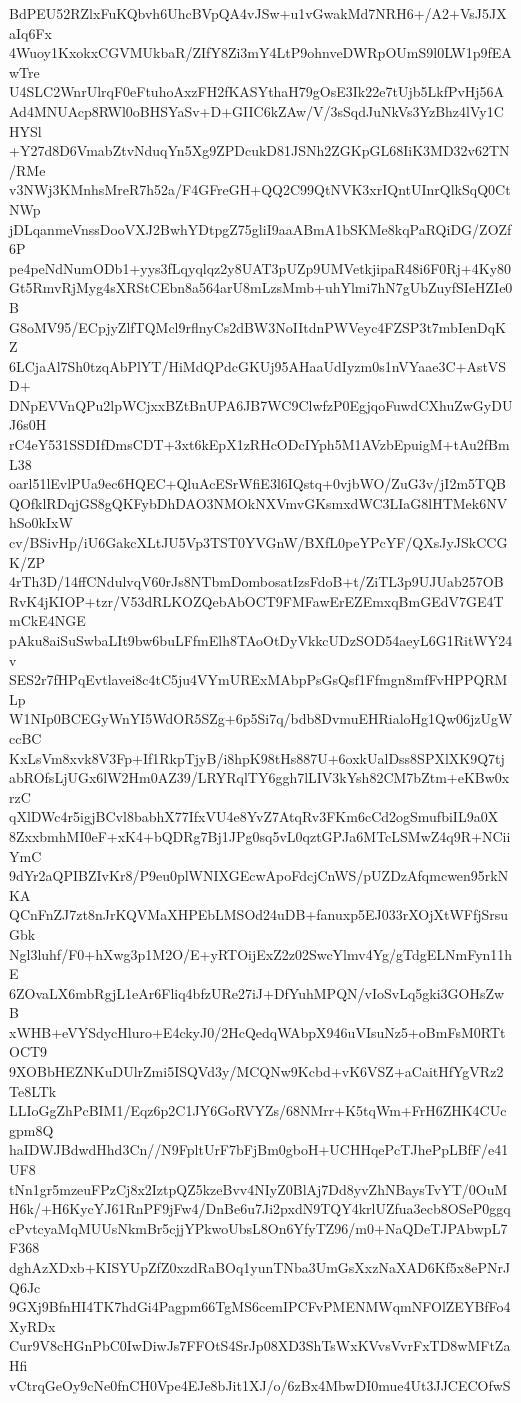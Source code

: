 BdPEU52RZlxFuKQbvh6UhcBVpQA4vJSw+u1vGwakMd7NRH6+/A2+VsJ5JXaIq6Fx
4Wuoy1KxokxCGVMUkbaR/ZIfY8Zi3mY4LtP9ohnveDWRpOUmS9l0LW1p9fEAwTre
U4SLC2WnrUlrqF0eFtuhoAxzFH2fKASYthaH79gOsE3Ik22e7tUjb5LkfPvHj56A
Ad4MNUAcp8RWl0oBHSYaSv+D+GIIC6kZAw/V/3sSqdJuNkVs3YzBhz4lVy1CHYSl
+Y27d8D6VmabZtvNduqYn5Xg9ZPDcukD81JSNh2ZGKpGL68IiK3MD32v62TN/RMe
v3NWj3KMnhsMreR7h52a/F4GFreGH+QQ2C99QtNVK3xrIQntUInrQlkSqQ0CtNWp
jDLqanmeVnssDooVXJ2BwhYDtpgZ75gliI9aaABmA1bSKMe8kqPaRQiDG/ZOZf6P
pe4peNdNumODb1+yys3fLqyqlqz2y8UAT3pUZp9UMVetkjipaR48i6F0Rj+4Ky80
Gt5RmvRjMyg4sXRStCEbn8a564arU8mLzsMmb+uhYlmi7hN7gUbZuyfSIeHZIe0B
G8oMV95/ECpjyZlfTQMcl9rflnyCs2dBW3NoIItdnPWVeyc4FZSP3t7mbIenDqKZ
6LCjaAl7Sh0tzqAbPlYT/HiMdQPdcGKUj95AHaaUdIyzm0s1nVYaae3C+AstVSD+
DNpEVVnQPu2lpWCjxxBZtBnUPA6JB7WC9ClwfzP0EgjqoFuwdCXhuZwGyDUJ6s0H
rC4eY531SSDIfDmsCDT+3xt6kEpX1zRHcODcIYph5M1AVzbEpuigM+tAu2fBmL38
oarl51lEvlPUa9ec6HQEC+QluAcESrWfiE3l6IQstq+0vjbWO/ZuG3v/jI2m5TQB
QOfklRDqjGS8gQKFybDhDAO3NMOkNXVmvGKsmxdWC3LIaG8lHTMek6NVhSo0kIxW
cv/BSivHp/iU6GakcXLtJU5Vp3TST0YVGnW/BXfL0peYPcYF/QXsJyJSkCCGK/ZP
4rTh3D/14ffCNdulvqV60rJs8NTbmDombosatIzsFdoB+t/ZiTL3p9UJUab257OB
RvK4jKIOP+tzr/V53dRLKOZQebAbOCT9FMFawErEZEmxqBmGEdV7GE4TmCkE4NGE
pAku8aiSuSwbaLIt9bw6buLFfmElh8TAoOtDyVkkcUDzSOD54aeyL6G1RitWY24v
SES2r7fHPqEvtlavei8c4tC5ju4VYmURExMAbpPsGsQsf1Ffmgn8mfFvHPPQRMLp
W1NIp0BCEGyWnYI5WdOR5SZg+6p5Si7q/bdb8DvmuEHRialoHg1Qw06jzUgWccBC
KxLsVm8xvk8V3Fp+If1RkpTjyB/i8hpK98tHs887U+6oxkUalDss8SPXlXK9Q7tj
abROfsLjUGx6lW2Hm0AZ39/LRYRqlTY6ggh7lLIV3kYsh82CM7bZtm+eKBw0xrzC
qXlDWc4r5igjBCvl8babhX77IfxVU4e8YvZ7AtqRv3FKm6cCd2ogSmufbiIL9a0X
8ZxxbmhMI0eF+xK4+bQDRg7Bj1JPg0sq5vL0qztGPJa6MTcLSMwZ4q9R+NCiiYmC
9dYr2aQPIBZIvKr8/P9eu0plWNIXGEcwApoFdcjCnWS/pUZDzAfqmcwen95rkNKA
QCnFnZJ7zt8nJrKQVMaXHPEbLMSOd24uDB+fanuxp5EJ033rXOjXtWFfjSrsuGbk
Ngl3luhf/F0+hXwg3p1M2O/E+yRTOijExZ2z02SwcYlmv4Yg/gTdgELNmFyn11hE
6ZOvaLX6mbRgjL1eAr6Fliq4bfzURe27iJ+DfYuhMPQN/vIoSvLq5gki3GOHsZwB
xWHB+eVYSdycHluro+E4ckyJ0/2HcQedqWAbpX946uVIsuNz5+oBmFsM0RTtOCT9
9XOBbHEZNKuDUlrZmi5ISQVd3y/MCQNw9Kcbd+vK6VSZ+aCaitHfYgVRz2Te8LTk
LLIoGgZhPcBIM1/Eqz6p2C1JY6GoRVYZs/68NMrr+K5tqWm+FrH6ZHK4CUcgpm8Q
haIDWJBdwdHhd3Cn//N9FpltUrF7bFjBm0gboH+UCHHqePcTJhePpLBfF/e41UF8
tNn1gr5mzeuFPzCj8x2IztpQZ5kzeBvv4NIyZ0BlAj7Dd8yvZhNBaysTvYT/0OuM
H6k/+H6KycYJ61RnPF9jFw4/DnBe6u7Ji2pxdN9TQY4krlUZfua3ecb8OSeP0ggq
cPvtcyaMqMUUsNkmBr5cjjYPkwoUbsL8On6YfyTZ96/m0+NaQDeTJPAbwpL7F368
dghAzXDxb+KISYUpZfZ0xzdRaBOq1yunTNba3UmGsXxzNaXAD6Kf5x8ePNrJQ6Jc
9GXj9BfnHI4TK7hdGi4Pagpm66TgMS6cemIPCFvPMENMWqmNFOlZEYBfFo4XyRDx
Cur9V8cHGnPbC0IwDiwJs7FFOtS4SrJp08XD3ShTsWxKVvsVvrFxTD8wMFtZaHfi
vCtrqGeOy9cNe0fnCH0Vpe4EJe8bJit1XJ/o/6zBx4MbwDI0mue4Ut3JJCECOfwS
